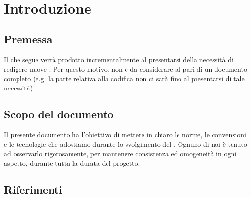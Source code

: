 \section{Introduzione} \label{Introduzione}

    

    \subsection{Premessa}
    Il  che segue verrà prodotto incrementalmente al presentarsi della necessità di redigere nuove .
    Per questo motivo, non è da considerare al pari di un documento completo (e.g. la parte relativa alla codifica non ci sarà fino
    al presentarsi di tale necessità).

    \subsection{Scopo del documento}
    Il presente documento ha l’obiettivo di mettere in chiaro le norme, le convenzioni e le tecnologie che adottiamo durante lo svolgimento del .
    Ognuno di noi \`e tenuto ad osservarlo rigorosamente, per mantenere consistenza ed omogeneit\`a in ogni aspetto, durante tutta la durata del progetto.

    


\subsection{Riferimenti}\label{Riferimenti}


